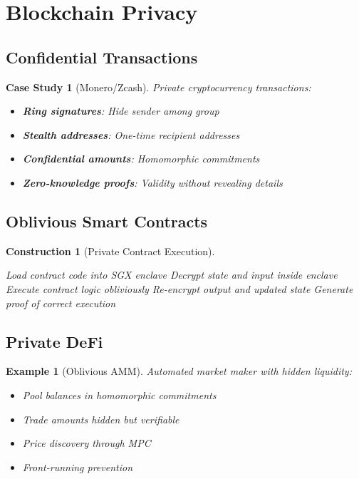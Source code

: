 \documentclass[11pt,final,hidelinks]{article}
\newtheorem{example}[theorem]{Example}
\newtheorem{construction}[theorem]{Construction}
\newtheorem{casestudy}[theorem]{Case Study}
\begin{document}
\section{Blockchain Privacy}

\subsection{Confidential Transactions}

\begin{casestudy}[Monero/Zcash]
Private cryptocurrency transactions:
\begin{itemize}
    \item \textbf{Ring signatures}: Hide sender among group
    \item \textbf{Stealth addresses}: One-time recipient addresses
    \item \textbf{Confidential amounts}: Homomorphic commitments
    \item \textbf{Zero-knowledge proofs}: Validity without revealing details
\end{itemize}
\end{casestudy}

\subsection{Oblivious Smart Contracts}

\begin{construction}[Private Contract Execution]
\begin{algorithm}[H]
\caption{Oblivious Smart Contract}
Load contract code into SGX enclave\;
Decrypt state and input inside enclave\;
Execute contract logic obliviously\;
Re-encrypt output and updated state\;
Generate proof of correct execution\;
\end{algorithm}
\end{construction}

\subsection{Private DeFi}

\begin{example}[Oblivious AMM]
Automated market maker with hidden liquidity:
\begin{itemize}
    \item Pool balances in homomorphic commitments
    \item Trade amounts hidden but verifiable
    \item Price discovery through MPC
    \item Front-running prevention
\end{itemize}
\end{example}
\end{document}
